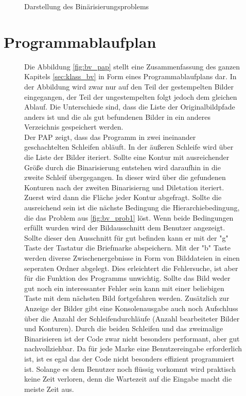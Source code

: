 \documentclass[12pt,toc=bib,toc=listof]{scrreprt}
\begin{document}
\begin{figure}[h]
\begin{minipage}[t]{.2\linewidth}
  \caption{Darstellung des Binärisierungsproblems}
  \label{fig:bv_prob3}
\end{minipage}
\end{figure}

\section{Programmablaufplan}
\label{sec_bv:pap}
\begin{figure}[h]
\begin{minipage}[t]{.6\linewidth}

Die Abbildung \ref{fig:bv_pap} stellt eine Zusammenfassung des ganzen Kapitels \ref{sec:klass_bv} in Form eines Programmablaufplans dar. In der Abbildung wird zwar nur auf den Teil der gestempelten Bilder eingegangen, der  Teil der ungestempelten folgt jedoch dem gleichen Ablauf. Die Unterschiede sind, dass die Liste der Originalbildpfade anders ist und die als gut befundenen Bilder in ein anderes Verzeichnis gespeichert werden.\\
Der PAP zeigt, dass das Programm in zwei ineinander geschachtelten Schleifen abläuft. In der äußeren Schleife wird über die Liste der Bilder iteriert. Sollte eine Kontur mit ausreichender Größe durch die Binarisierung entstehen wird daraufhin in die zweite Schleif übergegangen. In dieser wird über die gefundenen Konturen nach der zweiten Binarisierng und Diletation iteriert. Zuerst wird dann die Fläche jeder Kontur abgefragt. Sollte die ausreichend sein ist die nächste Bedingung die Hierarchiebedingung, die das Problem aus \ref{fig:bv_prob1} löst. Wenn beide Bedingungen erfüllt wurden wird der Bildausschnitt dem Benutzer angezeigt. Sollte dieser den Ausschnitt für gut befinden kann er mit der "g" Taste der Tastatur die Briefmarke abspeichern. Mit der "b" Taste werden diverse Zwischenergebnisse in Form von Bilddateien in einen seperaten Ordner abgelegt. Dies erleichtert die Fehlersuche, ist aber für die Funktion des Programms unwichtig. Sollte das Bild weder gut noch ein interessanter Fehler sein kann mit einer beliebigen Taste mit dem nächsten Bild fortgefahren werden. Zusätzlich zur Anzeige der Bilder gibt eine Konsolenausgabe auch noch Aufschluss über die Anzahl der Schleifendurchläufe (Anzahl bearbeiteter Bilder und Konturen). Durch die beiden Schleifen und das zweimalige Binarisieren ist der Code zwar nicht besonders performant, aber gut nachvollziehbar. Da für jede Marke eine Benutzereingabe erforderlich ist, ist es egal das der Code nicht besonders effizient programmiert ist. Solange es dem Benutzer noch flüssig vorkommt wird praktisch keine Zeit verloren,  denn die Wartezeit auf die Eingabe macht die meiste Zeit aus.

\end{minipage}
\end{figure}
\end{document}
